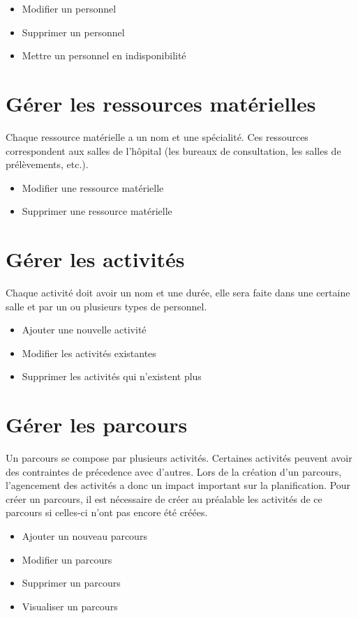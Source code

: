 \documentclass[noposter]{polytech/polytech}
\begin{document}
\begin{itemize}
	\item Modifier un personnel
	\item Supprimer un personnel
	\item Mettre un personnel en indisponibilité
\end{itemize}

\section{Gérer les ressources matérielles}

Chaque ressource matérielle a un nom et une spécialité. Ces ressources correspondent aux salles de l'hôpital (les bureaux de consultation, les salles de prélèvements, etc.).

\begin{itemize}
	\item Modifier une ressource matérielle
	\item Supprimer une ressource matérielle 
\end{itemize}


\section{Gérer les activités}

Chaque activité doit avoir un nom et une durée, elle sera faite dans une certaine salle et par un ou plusieurs types de personnel.

\begin{itemize}
	\item Ajouter une nouvelle activité
	\item Modifier les activités existantes
	\item Supprimer les activités qui n'existent plus
\end{itemize}


\section{Gérer les parcours}

Un parcours se compose par plusieurs activités. Certaines activités peuvent avoir des contraintes de précedence avec d'autres. Lors de la création d'un parcours, l'agencement des activités a donc un impact important sur la planification. Pour créer un parcours, il est nécessaire de créer au préalable les activités de ce parcours si celles-ci n'ont pas encore été créées.

\begin{itemize}
	\item Ajouter un nouveau parcours
	\item Modifier un parcours
	\item Supprimer un parcours
	\item Visualiser un parcours
\end{itemize}
\end{document}
